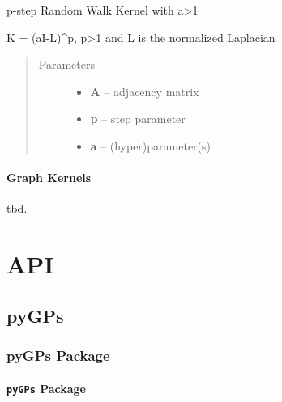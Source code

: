 \documentclass[letterpaper,10pt,english]{sphinxmanual}
\begin{document}
\begin{fulllineitems}
\label{Graph:pyGPs.GraphStuff.kernels_on_graph.rwKernel}
p-step Random Walk Kernel with a\textgreater{}1

K = (aI-L)\textasciicircum{}p, p\textgreater{}1 and L is the normalized Laplacian
\begin{quote}\begin{description}
\item[{Parameters}] \leavevmode\begin{itemize}
\item {} 
\textbf{A} -- adjacency matrix

\item {} 
\textbf{p} -- step parameter

\item {} 
\textbf{a} -- (hyper)parameter(s)

\end{itemize}

\end{description}\end{quote}

\end{fulllineitems}



\subsubsection{Graph Kernels}
\label{Graph:graph-kernels}
tbd.


\chapter{API}
\label{index:api}

\section{pyGPs}
\label{modules:pygps}\label{modules::doc}

\subsection{pyGPs Package}
\label{pyGPs::doc}\label{pyGPs:pygps-package}

\subsubsection{\texttt{pyGPs} Package}
\label{pyGPs:id1}\label{pyGPs:module-pyGPs.__init__}
\end{document}
